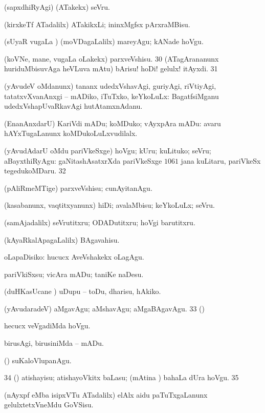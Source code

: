 {{ (sapxdhiRyAgi) (ATakekx) seVru. 

 (kirxkeTf
ATadalilx) ATakikxLi; ininxMgfsx pArxraMBisu. 

 (sUyaR \mo vugaLa \vi)
(moVDagaLalilx) mareyAgu; kANade hoVgu. 

 (koVNe, mane, \mo vugaLa oLakekx)
parxveVshisu. 
\num{30}  (ATagArananunx huriduMbisuvAga
heVLuva mAtu) bArisu! hoDi! gelulx! itAyxdi. 
\num{31}  

 (yAvudeV oMdanunx) tananx udedxVshavAgi, guriyAgi,
riVtiyAgi, tatatxvXvanAnxgi -- mADiko, iTuTxko, keYkoLuLx:  
BagatfsiMganu udedxVshapUvaRkavAgi hutAtamxnAdanu. 

 (EnanAnxdarU) KariVdi
mADu; koMDuko; vAyxpAra mADu:  avaru
hAYxTugaLanunx koMDukoLuLxvudilalx.  

 (yAvudAdarU oMdu pariVkeSxge) hoVgu; kUru; kuLituko; seVru;
aBayxthiRyAgu: 
gaNitashAsatxrXda pariVkeSxge $1061$ jana kuLitaru, pariVkeSx
tegedukoMDaru.  
\num{32}  

 (pAliRmeMTige) parxveVshisu; cunAyitanAgu. 

 (kasabanunx, vaqtitxyanunx) hiDi; avalaMbisu; keYkoLuLx; seVru. 

 (samAjadalilx) seVrutitxru; ODADutitxru; hoVgi barutitxru. 

 (kAyaRkalApagaLalilx) BAgavahisu.

 oLapaDisiko:  hucucx AveVshakekx oLagAgu. 

 pariVkiSxsu; vicAra mADu; taniKe naDesu. 

 (duHKasUcane \mo) uDupu -- toDu, dharisu, hAkiko. 

 (yAvudaradeV) aMgavAgu; aMshavAgu; aMgaBAgavAgu. 
\num{33}  (\AmA) 

 hecucx veVgadiMda hoVgu. 

 birusAgi, birusiniMda -- mADu. 

 (\rUpa) suKaloVlupanAgu. 
\num{34} 
(\AmA) atishayisu; atishayoVkitx baLasu; (mAtina \vi) bahaLa dUra hoVgu.
\num{35}  

 (nAyxpf eMba isipxVTu ATadalilx) elAlx aidu paTuTxgaLanunx gelulxtetxVneMdu GoVSisu. 

}}
